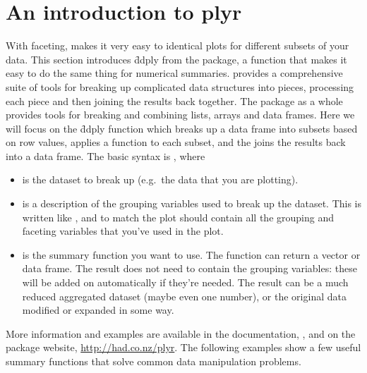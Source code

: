 \section{An introduction to plyr}
\label{sec:plyr}

With faceting, \ggplot makes it very easy to identical plots for different subsets of your data. This section introduces \f{ddply} from the  package, a function that makes it easy to do the same thing for numerical summaries.  provides a comprehensive suite of tools for breaking up complicated data structures into pieces, processing each piece and then joining the results back together. The  package as a whole provides tools for breaking and combining lists, arrays and data frames. Here we will focus on the \f{ddply} function which breaks up a data frame into subsets based on row values, applies a function to each subset, and the joins the results back into a data frame. The basic syntax is , where

\begin{itemize}

  \item {} is the dataset to break up (e.g.\ the data that you are plotting).

  \item {} is a description of the grouping variables used to break up the dataset. This is written like , and to match the plot should contain all the grouping and faceting variables that you've used in the plot.

  \item {} is the summary function you want to use. The function can return a vector or data frame. The result does not need to contain the grouping variables: these will be added on automatically if they're needed. The result can be a much reduced aggregated dataset (maybe even one number), or the original data modified or expanded in some way.

\end{itemize}

More information and examples are available in the documentation, , and on the package website, \url{http://had.co.nz/plyr}.  The following examples show a few useful summary functions that solve common data manipulation problems.

